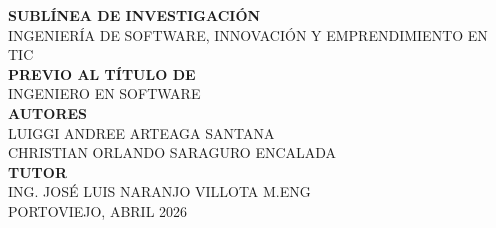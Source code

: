 \begin{titlepage}
\begin{center}
{\fontsize{11pt}{11pt}\selectfont \textbf{SUBLÍNEA DE INVESTIGACIÓN}}\\[-6pt]
{\fontsize{11pt}{11pt}\selectfont INGENIERÍA DE SOFTWARE, INNOVACIÓN Y EMPRENDIMIENTO EN TIC}\\[15pt]

{\fontsize{11pt}{11pt}\selectfont \textbf{PREVIO AL TÍTULO DE}}\\
{\fontsize{15pt}{15pt}\selectfont INGENIERO EN SOFTWARE}\\[10pt]

{\fontsize{13.2pt}{13.2pt}\selectfont \textbf{AUTORES}}\\[-6pt]
{\fontsize{13.2pt}{13.2pt}\selectfont LUIGGI ANDREE ARTEAGA SANTANA}\\[-6pt]
{\fontsize{13.2pt}{13.2pt}\selectfont CHRISTIAN ORLANDO SARAGURO ENCALADA}\\[10pt]



{\fontsize{13pt}{13pt}\selectfont \textbf{TUTOR}}\\[-6pt]
{\fontsize{13pt}{13pt}\selectfont ING. JOSÉ LUIS NARANJO VILLOTA M.ENG}\\[10pt]



{\fontsize{11pt}{11pt}\selectfont PORTOVIEJO, ABRIL 2026}

\end{center}

\end{titlepage}

